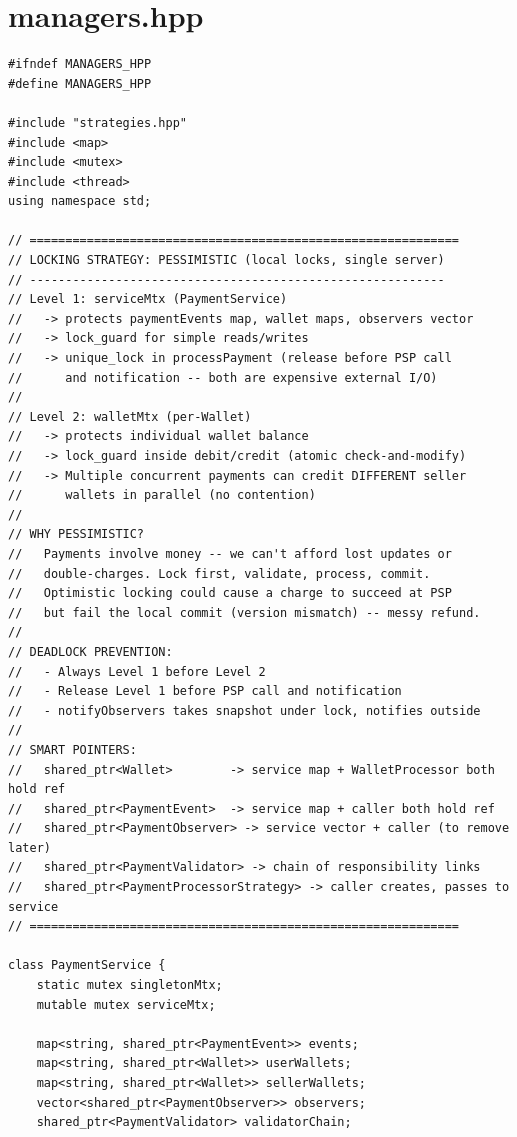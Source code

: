 \documentclass[11pt,a4paper]{article}
\begin{document}
\section{managers.hpp}
\begin{lstlisting}[title={\texttt{managers.hpp}}]
#ifndef MANAGERS_HPP
#define MANAGERS_HPP

#include "strategies.hpp"
#include <map>
#include <mutex>
#include <thread>
using namespace std;

// ============================================================
// LOCKING STRATEGY: PESSIMISTIC (local locks, single server)
// ----------------------------------------------------------
// Level 1: serviceMtx (PaymentService)
//   -> protects paymentEvents map, wallet maps, observers vector
//   -> lock_guard for simple reads/writes
//   -> unique_lock in processPayment (release before PSP call
//      and notification -- both are expensive external I/O)
//
// Level 2: walletMtx (per-Wallet)
//   -> protects individual wallet balance
//   -> lock_guard inside debit/credit (atomic check-and-modify)
//   -> Multiple concurrent payments can credit DIFFERENT seller
//      wallets in parallel (no contention)
//
// WHY PESSIMISTIC?
//   Payments involve money -- we can't afford lost updates or
//   double-charges. Lock first, validate, process, commit.
//   Optimistic locking could cause a charge to succeed at PSP
//   but fail the local commit (version mismatch) -- messy refund.
//
// DEADLOCK PREVENTION:
//   - Always Level 1 before Level 2
//   - Release Level 1 before PSP call and notification
//   - notifyObservers takes snapshot under lock, notifies outside
//
// SMART POINTERS:
//   shared_ptr<Wallet>        -> service map + WalletProcessor both hold ref
//   shared_ptr<PaymentEvent>  -> service map + caller both hold ref
//   shared_ptr<PaymentObserver> -> service vector + caller (to remove later)
//   shared_ptr<PaymentValidator> -> chain of responsibility links
//   shared_ptr<PaymentProcessorStrategy> -> caller creates, passes to service
// ============================================================

class PaymentService {
    static mutex singletonMtx;
    mutable mutex serviceMtx;

    map<string, shared_ptr<PaymentEvent>> events;
    map<string, shared_ptr<Wallet>> userWallets;
    map<string, shared_ptr<Wallet>> sellerWallets;
    vector<shared_ptr<PaymentObserver>> observers;
    shared_ptr<PaymentValidator> validatorChain;


\end{lstlisting}
\end{document}
